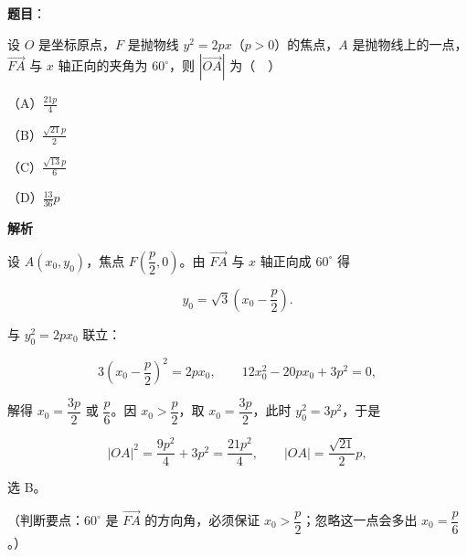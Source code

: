 \begin{answer}

\textbf{题目}：

设 $O$ 是坐标原点，$F$ 是抛物线 $y^2=2px$（$p>0$）的焦点，$A$ 是抛物线上的一点，$\overrightarrow{FA}$ 与 $x$ 轴正向的夹角为 $60^\circ$，则 $\left|\overrightarrow{OA}\right|$ 为（　）

（A）$\frac{21p}{4}$

（B）$\frac{\sqrt{21}p}{2}$

（C）$\frac{\sqrt{13}p}{6}$

（D）$\frac{13}{36}p$

\textbf{解析}

设 $A(x_0,y_0)$，焦点 $F\left(\dfrac p2,0\right)$。由 $\overrightarrow{FA}$ 与 $x$ 轴正向成 $60^\circ$ 得

\nopagebreak[4]
\[y_0=\sqrt3\left(x_0-\frac p2\right).\]

与 $y_0^2=2px_0$ 联立：

\nopagebreak[4]
\[3\left(x_0-\frac p2\right)^2=2px_0,\qquad 12x_0^2-20px_0+3p^2=0,\]

解得 $x_0=\dfrac{3p}{2}$ 或 $\dfrac p6$。因 $x_0>\dfrac p2$，取 $x_0=\dfrac{3p}{2}$，此时 $y_0^2=3p^2$，于是

\nopagebreak[4]
\[|OA|^2=\frac{9p^2}{4}+3p^2=\frac{21p^2}{4},\qquad |OA|=\frac{\sqrt{21}}{2}p,\]

选 B。

（判断要点：$60^\circ$ 是 $\overrightarrow{FA}$ 的方向角，必须保证 $x_0>\dfrac p2$；忽略这一点会多出 $x_0=\dfrac p6$。）


\end{answer}
